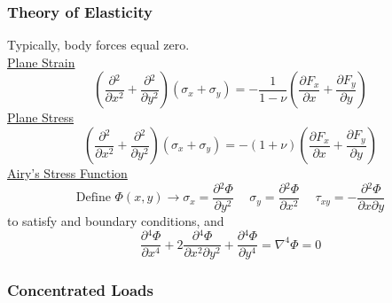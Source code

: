 \documentclass[twocolumn, 12pt]{article}    %
\begin{document}
\subsubsection*{Theory of Elasticity}
Typically, body forces equal zero.\\
\underline{Plane Strain}\\
\begin{equation*}
    \left(  \frac{\partial{^2}}{\partial{x^2}} +  \frac{\partial{^2}}{\partial{y^2}} \right)(\sigma_x + \sigma_y) = -\frac{1}{1-\nu} \left( \frac{\partial{F_x}}{\partial{x}} + \frac{\partial{F_y}}{\partial{y}} \right)
\end{equation*}
\underline{Plane Stress}\\
\begin{equation*}
    \left(  \frac{\partial{^2}}{\partial{x^2}} +  \frac{\partial{^2}}{\partial{y^2}} \right)(\sigma_x + \sigma_y) = -(1+\nu) \left( \frac{\partial{F_x}}{\partial{x}} + \frac{\partial{F_y}}{\partial{y}} \right)
\end{equation*}
\underline{Airy's Stress Function}\\
\begin{equation*}
    \text{Define } \Phi(x,y) \longrightarrow \sigma_x = \frac{\partial{^2 \Phi}}{\partial{y^2}}   \hspace{15pt} \sigma_y =  \frac{\partial{^2 \Phi}}{\partial{x^2}} \hspace{15pt} \tau_{xy} = - \frac{\partial{^2 \Phi}}{\partial x \partial y} 
\end{equation*}
\noindent to satisfy and boundary conditions, and
\begin{equation*}
     \frac{\partial{^4 \Phi}}{\partial{x^4}} + 2  \frac{\partial{^4 \Phi}}{\partial{x^2} \partial y^2} +  \frac{\partial{^4 \Phi}}{\partial{y^4}} = \nabla ^4\Phi = 0
\end{equation*}


\subsubsection*{Concentrated Loads}
\end{document}
